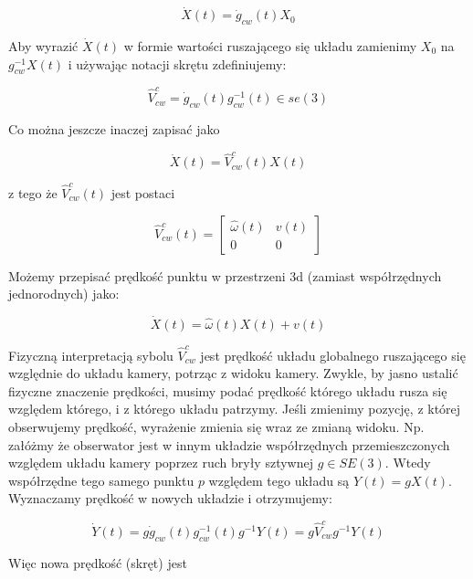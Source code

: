 \documentclass[a4paper,12pt]{article}
\begin{document}
\begin{equation}
\dot{X}(t)=\dot{g}_{cw}(t)X_0
\end{equation}

Aby wyrazić $\dot{X}(t)$ w formie wartości ruszającego się układu zamienimy $X_0$ na $g_{cw}^{-1}X(t)$ i używając notacji skrętu zdefiniujemy:

\begin{equation}
\hat{V}^c_{cw}=\dot{g}_{cw}(t)g^{-1}_{cw}(t) \in se(3)
\end{equation}

\noindent Co można jeszcze inaczej zapisać jako

\begin{equation}
\dot{X}(t) = \hat{V}^c_{cw}(t)X(t)
\end{equation}

\noindent z tego że $\hat{V}^c_{cw}(t)$ jest postaci

\begin{equation}
\hat{V}^c_{cw}(t)= \begin{bmatrix} \hat{\omega}(t) & v(t) \\ 0 & 0 \end{bmatrix}
\end{equation}

\noindent Możemy przepisać prędkość punktu w przestrzeni 3d (zamiast współrzędnych jednorodnych) jako:

\begin{equation}
\dot{X}(t) = \hat{\omega}(t)X(t) + v(t)
\end{equation}

Fizyczną interpretacją sybolu $\hat{V}^c_{cw}$ jest prędkość układu globalnego ruszającego się względnie do układu kamery, potrząc z widoku kamery. Zwykle, by jasno ustalić fizyczne znaczenie prędkości, musimy podać prędkość którego układu rusza się względem którego, i z którego układu patrzymy. Jeśli zmienimy pozycję, z której obserwujemy prędkość, wyrażenie zmienia się wraz ze zmianą widoku. Np. załóżmy że obserwator jest w innym układzie współrzędnych przemieszczonych względem układu kamery poprzez ruch bryły sztywnej $g \in SE(3)$. Wtedy współrzędne tego samego punktu $p$ względem tego układu są $Y(t) = gX(t)$. Wyznaczamy prędkość w nowych układzie i otrzymujemy:

\begin{equation}
\dot{Y}(t)=g\dot{g}_{cw}(t)g^{-1}_{cw}(t)g^{-1}Y(t)=g\hat{V}^c_{cw}g^{-1}Y(t)
\end{equation}

\noindent Więc nowa prędkość (skręt) jest
\end{document}
